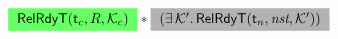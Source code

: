 \begin{figure}[!t]
\[\begin{array}{lll}
{\begin{array}{l}
                        \colorbox{green!60}
                        {
                            $\RelRdyT{\thrdid_c}{\RFile}{\hthrdlocalst_c}$
                        } 
                        \sepstar
                        \colorbox{gray!60}
                        {
                            $(\exists \, \hthrdlocalst'. \, 
                                \RelRdyT{\thrdid_n}{\nst}{\hthrdlocalst'})$
                        }  

\end{array}}
\end{array}\]
\end{figure}
